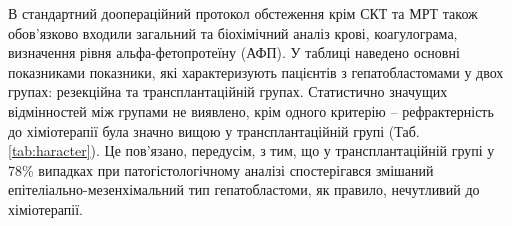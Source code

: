 В стандартний доопераційний протокол обстеження крім СКТ та МРТ також обов’язково входили загальний та біохімічний аналіз крові, коагулограма, визначення рівня альфа-фетопротеїну (АФП). У таблиці наведено основні показниками показники, які характеризують пацієнтів  з гепатобластомами у двох групах: резекційна та трансплантаційній групах. Статистично значущих відмінностей між групами не виявлено, крім одного критерію – рефрактерність до хіміотерапії була значно вищою у трансплантаційній групі (Таб. \ref{tab:haracter}). Це пов’язано, передусім, з тим, що у трансплантаційній групі у 78\% випадках при патогістологічному аналізі спостерігався змішаний епітеліально-мезенхімальний тип гепатобластоми, як правило, нечутливий до хіміотерапії. 

